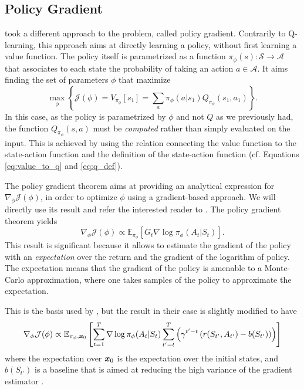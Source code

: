 \subsection{Policy Gradient}
\citet{bakker2020experimental} took a different approach to the problem, called policy gradient. Contrarily to Q-learning, this approach aims at directly learning a policy, without first learning a value function. The policy itself is parametrized as a function $\pi_\phi(s): \mathcal{S}\to \mathcal{A}$ that associates to each state the probability of taking an action $a \in \mathcal{A}$. It aims finding the set of parameters $\phi$ that maximize
$$\max_\phi \left\{\mathcal{J}(\phi) = V_{\pi_\phi}[s_1] = \sum_a \pi_\phi(a|s_1)Q_{\pi_\phi}(s_1,a_1)\right\}.$$
In this case, as the policy is parametrized by $\phi$ and not $Q$ as we previously had, the function $Q_{\pi_\phi}(s,a)$ must be \textit{computed} rather than simply evaluated on the input. This is achieved by using the relation connecting the value function to the state-action function and the definition of the state-action function (cf. Equations \ref{eq:value_to_q} and \ref{eq:q_def}).

The policy gradient theorem aims at providing an analytical expression for $\nabla_\phi \mathcal{J}(\phi)$, in order to optimize $\phi$ using a gradient-based approach. We will directly use its result and refer the interested reader to \citet[p.324ff]{sutton2018reinforcement}. The policy gradient theorem yields
\begin{equation}
    \nabla_\phi \mathcal{J}(\phi)\propto \mathbb{E}_{\pi_\phi}\left[ G_t \nabla \log \pi_\phi(A_t|S_t)\right].\label{eq:policy_gradient}
\end{equation}
This result is significant because it allows to estimate the gradient of the policy with an \textit{expectation} over the return and the gradient of the logarithm of policy. The expectation means that the gradient of the policy is amenable to a Monte-Carlo approximation, where one takes samples of the policy to approximate the expectation.

This is the basis used by \citet{bakker2020experimental}, but the result in their case is slightly modified to have
\begin{equation}
    \nabla_\phi \mathcal{J}(\phi)\propto \mathbb{E}_{\pi_\phi,{\bm{x}}_0}\left[ \sum_{t=1}^{T} \nabla \log \pi_\phi(A_t|S_t) \sum_{t'=t}^{T}\left( \gamma^{t'-t} \left(r(S_{t'},A_{t'})- b(S_{t'})\right)\right)\right] \label{eq:bakker_grad1}    
\end{equation}
where the expectation over ${\bm{x}}_0$ is the expectation over the initial states, and $b(S_{t'})$ is a baseline that is aimed at reducing the high variance of the gradient estimator \citep[pp. 329-331]{sutton2018reinforcement}. 

